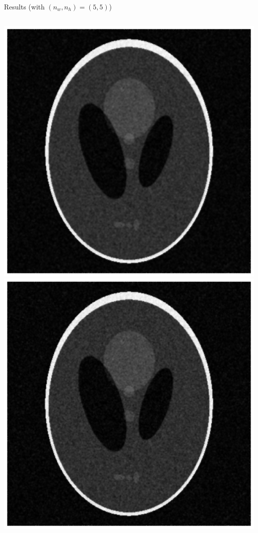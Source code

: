 \begin{frame}{Results (with $(n_w, n_h) = (5, 5)$)}
\centering
\begin{columns}
\centering
\includegraphics[scale=0.25]{images/results/bilateral/image_mae.png}
\centering
\includegraphics[scale=0.25]{images/results/bilateral/image_mse.png}
\end{columns}
\end{frame}

